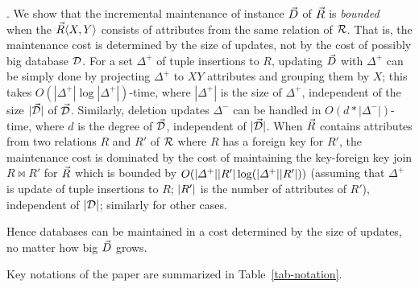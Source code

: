 .
We show that
the incremental maintenance of \baav instance $\vec{D}$
of $\vec{R}$ is {\em bounded}~\cite{Reps96} when the \bs $\vec{R}\langle X,\allowbreak Y\rangle$
consists of attributes from the same relation of ${\mathcal R}$.
That is, the maintenance cost is determined by the
  size of updates, not by the cost of possibly big database $\mathcal D$.
For a set $\Delta^{+}$ of tuple insertions to $R$, updating $\vec{D}$
with $\Delta^{+}$ %
can be simply done by projecting $\Delta^{+}$ %
to $XY$
attributes and grouping them by $X$; this takes
$O(|\Delta^{+}|\log|\Delta^{+}|)$-time, where $|\Delta^{+}|$ is
the size of $\Delta^{+}$, independent of the size $|\vec{\mathcal D}|$ of
$\vec{\mathcal D}$. Similarly, deletion updates $\Delta^{-}$ can be
handled in $O(d*|\Delta^{-}|)$-time, where $d$ is the degree of
$\vec{\mathcal D}$, independent of $|\vec{\mathcal D}|$. When $\vec{R}$ contains
attributes from \eg two relations $R$ and $R'$ of ${\mathcal R}$ where $R$
has a foreign key for $R'$, the
maintenance cost is dominated by the cost of
maintaining the key-foreign key join $R\Join R'$ for $\vec{R}$
which is bounded by
$O(|{\Delta^{+}}||{R'}|\log(|{\Delta^{+}}||{R'}|))$ (assuming
that $\Delta^{+}$ is update of tuple insertions
to $R$; $|{R'}|$ is the number of
attributes of $R'$), 
independent of $|{\mathcal D}|$; similarly for other cases.


Hence \baav databases can be maintained
  in a cost determined by the size of updates, no matter how
  big $\vec{D}$ grows.


\vspace{0.8ex}
Key notations of the paper are summarized in Table~\ref{tab-notation}.

